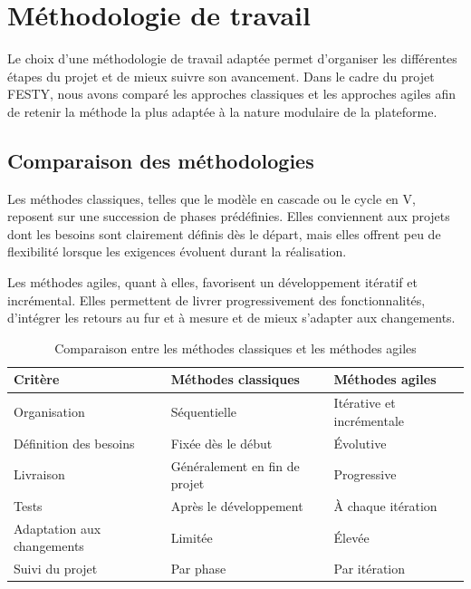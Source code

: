 \section{Méthodologie de travail}


Le choix d’une méthodologie de travail adaptée permet d’organiser les différentes étapes du projet et de mieux suivre son avancement. Dans le cadre du projet FESTY, nous avons comparé les approches classiques et les approches agiles afin de retenir la méthode la plus adaptée à la nature modulaire de la plateforme.


\subsection{Comparaison des méthodologies}


Les méthodes classiques, telles que le modèle en cascade ou le cycle en V, reposent sur une succession de phases prédéfinies. Elles conviennent aux projets dont les besoins sont clairement définis dès le départ, mais elles offrent peu de flexibilité lorsque les exigences évoluent durant la réalisation.


Les méthodes agiles, quant à elles, favorisent un développement itératif et incrémental. Elles permettent de livrer progressivement des fonctionnalités, d’intégrer les retours au fur et à mesure et de mieux s’adapter aux changements.


\begin{table}[H]
\centering
\caption{Comparaison entre les méthodes classiques et les méthodes agiles}
\label{tableau:1-3}
\renewcommand{\arraystretch}{1.2}
\begin{tabularx}{\textwidth}{|>{\raggedright\arraybackslash}X|>{\raggedright\arraybackslash}X|>{\raggedright\arraybackslash}X|}
\hline
\rowcolor[HTML]{ECF4FF}
\textbf{Critère} & \textbf{Méthodes classiques} & \textbf{Méthodes agiles} \\
\hline
Organisation & Séquentielle & Itérative et incrémentale \\
\hline
Définition des besoins & Fixée dès le début & Évolutive \\
\hline
Livraison & Généralement en fin de projet & Progressive \\
\hline
Tests & Après le développement & À chaque itération \\
\hline
Adaptation aux changements & Limitée & Élevée \\
\hline
Suivi du projet & Par phase & Par itération \\
\hline
\end{tabularx}
\end{table}



